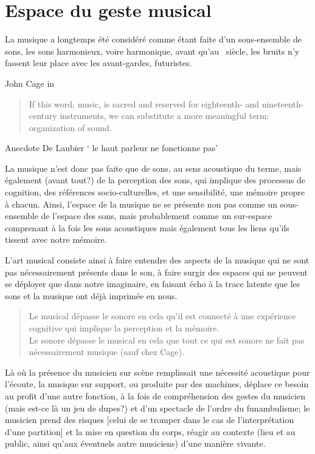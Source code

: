 \section*{Espace du geste musical}
La musique a longtemps été considéré comme étant faite d'un sous-ensemble de sons, les sons harmonieux, voire harmonique, avant qu'au ~siècle, les bruits n'y fassent leur place avec les avant-gardes, futuristes. 

John Cage in \cite{cage_silence:_1961}
\begin{quotation}
\noindent If this word, music, is sacred and reserved for eighteenth- and nineteenth-century instruments, we can substitute a more meaningful term: organization of sound.\\
\end{quotation}


Anecdote De Laubier ` le haut parleur ne fonctionne pas'

La musique n'est donc pas faite que de sons, au sens acoustique du terme, mais également (avant tout?) de la perception des sons, qui implique des processus de cognition, des références socio-culturelles, et une sensibilité, une mémoire propre à chacun. 
Ainsi, l'espace de la musique ne se présente non pas comme un sous-ensemble de l'espace des sons, mais probablement comme un sur-espace comprenant à la fois les sons acoustiques mais également tous les liens qu'ils tissent avec notre mémoire.


L'art musical consiste ainsi à faire entendre des aspects de la musique qui ne sont pas nécessairement présents dans le son, à faire surgir des espaces qui ne peuvent se déployer que dans notre imaginaire, en faisant écho à la trace latente que les sons et la musique ont déjà imprimée en nous.


\begin{quotation}
\noindent Le musical dépasse le sonore en cela qu’il est connecté à une expérience cognitive qui implique la perception et la mémoire.\\
Le sonore dépasse le musical en cela que tout ce qui est sonore ne fait pas nécessairement musique (sauf chez Cage).
\end{quotation}


Là où la présence du musicien sur scène remplissait une nécessité acoustique pour l’écoute, la musique sur support, ou produite par des machines, déplace ce besoin au profit d’une autre fonction, à la fois de compréhension des gestes du musicien (mais est-ce là un jeu de dupes?) et d’un spectacle de l’ordre du funambulisme; le musicien prend des risques [celui de se tromper dans le cas de l’interprétation d’une partition] et la mise en question du corps, réagir au contexte (lieu et au public, ainsi qu’aux éventuels autre musiciens) d’une manière vivante.

